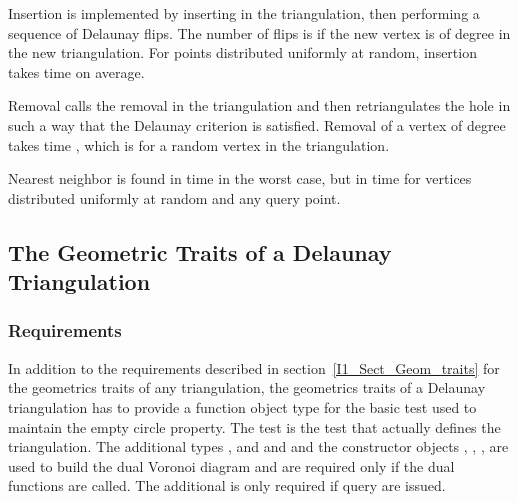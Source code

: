 





Insertion is implemented by inserting in the triangulation, then
performing a sequence of Delaunay flips. The number of flips is 
if the new vertex is of degree  in the new triangulation. For
points distributed uniformly at random, insertion takes time  on
average.

Removal calls the removal in the triangulation and then retriangulates
the hole in such a way that  the Delaunay criterion is satisfied. Removal of a
vertex of degree  takes time ,
which is  for a random
vertex in the triangulation.

Nearest neighbor is found in time  in the
worst case, but in time 
for vertices distributed uniformly at random  and any query point. 



\subsection{The Geometric Traits of a Delaunay Triangulation}
\label{I1_Sect_Delaunay_geom_traits}

\subsubsection{Requirements}
In addition to the requirements described in section~\ref{I1_Sect_Geom_traits}
for the geometrics traits of any triangulation,
the geometrics traits of a Delaunay triangulation
has to  provide a function object type  
for the basic  test used to maintain the
empty circle property.
The  test is the test 
that actually defines the triangulation.
The additional types ,  and
and  and the constructor objects
, 
, ,
are used to build the dual Voronoi diagram
and are required only if the dual functions are called.
The additional  is only required
if  query are issued.




